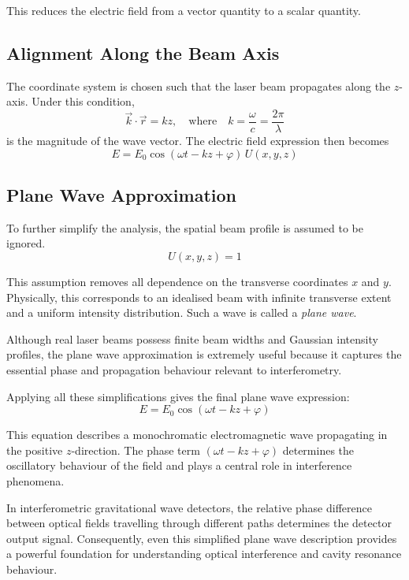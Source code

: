 \documentclass{report}
\begin{document}
This reduces the electric field from a vector quantity to a scalar quantity.

\subsection{Alignment Along the Beam Axis}

The coordinate system is chosen such that the laser beam propagates along the $z$-axis. Under this condition,
\begin{equation}
\vec{k}\cdot\vec{r}=kz,
\quad
\text{where}
\quad
k=\frac{\omega}{c}=\frac{2\pi}{\lambda}
\end{equation}
is the magnitude of the wave vector. The electric field expression then becomes
\begin{equation}
E = E_0 \cos(\omega t-kz+\varphi)\,U(x,y,z)
\end{equation}

\subsection{Plane Wave Approximation}

To further simplify the analysis, the spatial beam profile is assumed to be ignored.
\begin{equation}
U(x,y,z)=1
\end{equation}

This assumption removes all dependence on the transverse coordinates $x$ and $y$. Physically, this corresponds to an idealised beam with infinite transverse extent and a uniform intensity distribution. Such a wave is called a \textit{plane wave}.

Although real laser beams possess finite beam widths and Gaussian intensity profiles, the plane wave approximation is extremely useful because it captures the essential phase and propagation behaviour relevant to interferometry.

Applying all these simplifications gives the final plane wave expression:
\begin{equation}
E = E_0 \cos(\omega t-kz+\varphi)
\end{equation}

This equation describes a monochromatic electromagnetic wave propagating in the positive $z$-direction. The phase term $(\omega t-kz+\varphi)$ determines the oscillatory behaviour of the field and plays a central role in interference phenomena.

In interferometric gravitational wave detectors, the relative phase difference between optical fields travelling through different paths determines the detector output signal. Consequently, even this simplified plane wave description provides a powerful foundation for understanding optical interference and cavity resonance behaviour.
\end{document}
